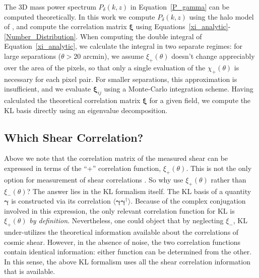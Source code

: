 \documentclass[twocolumn]{emulateapj}
\newcommand{\myvec}[1]{\boldsymbol{#1}}
\begin{document}
The 3D mass power spectrum $P_\delta(k,z)$ in Equation~\ref{P_gamma}
can be computed theoretically.  
In this work we compute $P_\delta(k,z)$ using the halo model of 
\citet{Smith03}, and compute the correlation matrix $\myvec\xi$ using 
Equations~\ref{xi_analytic}-\ref{Number_Distribution}.
When computing the double integral of Equation~\ref{xi_analytic},
we calculate the integral in two separate regimes:
for large separations ($\theta > 20$ arcmin), 
we assume $\xi_+(\theta)$ doesn't change appreciably over the area 
of the pixels, so that only a single evaluation of
the $\chi_+(\theta)$ is necessary for each pixel pair.  
For smaller separations, 
this approximation is insufficient, and we evaluate $\myvec\xi_{ij}$ using
a Monte-Carlo integration scheme.  Having calculated the 
theoretical correlation matrix $\myvec\xi$ for a given field, 
we compute the KL basis directly using an eigenvalue decomposition.

\subsection{Which Shear Correlation?}
\label{WhichCorrelation}
Above we note that the correlation matrix of the measured shear 
can be expressed
in terms of the ``+'' correlation function, $\xi_+(\theta)$.  This is not
the only option for measurement of shear correlations 
\citep[see, e.g.][]{Schneider02}.  So why use $\xi_+(\theta)$ rather 
than $\xi_-(\theta)$?  The answer lies in the KL formalism itself.  The KL
basis of a quantity $\myvec\gamma$ is constructed via its correlation
$\langle\myvec\gamma \myvec\gamma^\dagger\rangle$.  Because of the complex
conjugation involved in this expression, the only relevant correlation 
function for KL is $\xi_+(\theta)$ \textit{by definition}.  Nevertheless,
one could object that by neglecting $\xi_-$, 
KL under-utilizes the theoretical information available 
about the correlations of cosmic shear. However, in the absence of noise, 
the two correlation functions contain identical information: 
either function can be determined from the other.  
In this sense, the above KL formalism
uses all the shear correlation information that is available.
\end{document}
